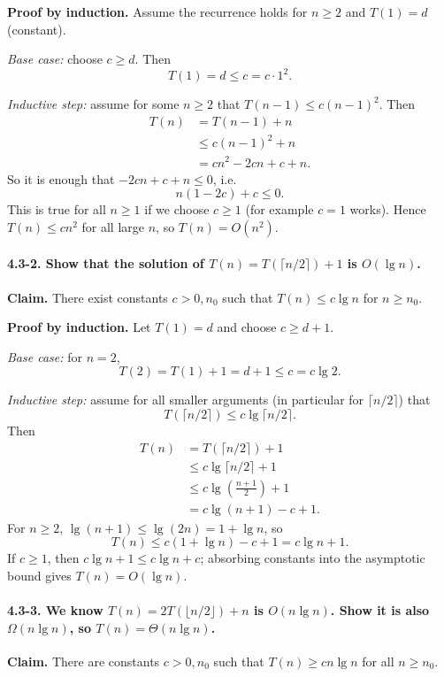 \documentclass{article}
\theoremstyle{theorem}
\theoremstyle{definition}
\theoremstyle{remark}
\begin{document}
\textbf{Proof by induction.}  
Assume the recurrence holds for $n\ge 2$ and $T(1)=d$ (constant).

\textit{Base case:} choose $c\ge d$. Then
\[
T(1)=d\le c=c\cdot 1^2.
\]

\textit{Inductive step:} assume for some $n\ge 2$ that $T(n-1)\le c(n-1)^2$. Then
\begin{align*}
T(n) &= T(n-1)+n \\
&\le c(n-1)^2+n \\
&= cn^2-2cn+c+n.
\end{align*}
So it is enough that $-2cn+c+n\le 0$, i.e.
\[
n(1-2c)+c\le 0.
\]
This is true for all $n\ge 1$ if we choose $c\ge 1$ (for example $c=1$ works). Hence $T(n)\le cn^2$ for all large $n$, so $T(n)=O(n^2)$.

\paragraph{4.3-2. Show that the solution of $T(n)=T(\lceil n/2\rceil)+1$ is $O(\lg n)$.}
\textbf{Claim.} There exist constants $c>0,n_0$ such that $T(n)\le c\lg n$ for $n\ge n_0$.

\textbf{Proof by induction.}  
Let $T(1)=d$ and choose $c\ge d+1$.

\textit{Base case:} for $n=2$,
\[
T(2)=T(1)+1=d+1\le c=c\lg 2.
\]

\textit{Inductive step:} assume for all smaller arguments (in particular for $\lceil n/2\rceil$) that
\[
T(\lceil n/2\rceil)\le c\lg\lceil n/2\rceil.
\]
Then
\begin{align*}
T(n) &= T(\lceil n/2\rceil)+1 \\
&\le c\lg\lceil n/2\rceil+1 \\
&\le c\lg\!\left(\frac{n+1}{2}\right)+1 \\
&= c\lg(n+1)-c+1.
\end{align*}
For $n\ge 2$, $\lg(n+1)\le \lg(2n)=1+\lg n$, so
\[
T(n)\le c(1+\lg n)-c+1 = c\lg n+1.
\]
If $c\ge 1$, then $c\lg n+1\le c\lg n + c$; absorbing constants into the asymptotic bound gives $T(n)=O(\lg n)$.

\paragraph{4.3-3. We know $T(n)=2T(\lfloor n/2\rfloor)+n$ is $O(n\lg n)$. Show it is also $\Omega(n\lg n)$, so $T(n)=\Theta(n\lg n)$.}
\textbf{Claim.} There are constants $c>0,n_0$ such that $T(n)\ge c n\lg n$ for all $n\ge n_0$.
\end{document}
